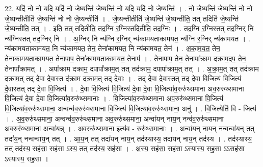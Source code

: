 \documentclass[17pt]{extarticle}
\begin{document}
22. यदि॑ नो नो॒ यदि॒ यदि॑ नो जे॒ष्यन्ति॑ जे॒ष्यन्ति॑ नो॒ यदि॒ यदि॑ नो जे॒ष्यन्ति॑ । . नो॒ जे॒ष्यन्ति॑ जे॒ष्यन्ति॑ नो नो जे॒ष्यन्तीतीति॑ जे॒ष्यन्ति॑ नो नो जे॒ष्यन्तीति॑ । . जे॒ष्यन्तीतीति॑ जे॒ष्यन्ति॑ जे॒ष्यन्तीति॒ तत् तदिति॑ जे॒ष्यन्ति॑ जे॒ष्यन्तीति॒ तत् । . इति॒ तत् तदितीति॒ तद॒ग्नि र॒ग्निस्तदितीति॒ तद॒ग्निः । . तद॒ग्नि र॒ग्निस्तत् तद॒ग्निर् नि न्य॑ग्निस्तत् तद॒ग्निर् नि । . अ॒ग्निर् नि न्य॑ग्नि र॒ग्निर् न्य॑कामयताकामयत॒ न्य॑ग्नि र॒ग्निर् न्य॑कामयत । . न्य॑कामयताकामयत॒ नि न्य॑कामयत॒ तेन॒ तेना॑कामयत॒ नि न्य॑कामयत॒ तेन॑ । . अ॒का॒म॒य॒त॒ तेन॒ तेना॑कामयताकामयत॒ तेनापाप॒ तेना॑कामयताकामयत॒ तेनाप॑ । . तेनापाप॒ तेन॒ तेनापा᳚क्राम दक्राम॒दप॒ तेन॒ तेनापा᳚क्रामत् । . अपा᳚क्राम दक्राम॒ दपापा᳚क्राम॒त् तत् तद॑क्राम॒ दपापा᳚क्राम॒त् तत् । . अ॒क्रा॒म॒त् तत् तद॑क्राम दक्राम॒त् तद् दे॒वा दे॒वास्त द॑क्राम दक्राम॒त् तद् दे॒वाः । . तद् दे॒वा दे॒वास्तत् तद् दे॒वा वि॒जित्य॑ वि॒जित्य॑ दे॒वास्तत् तद् दे॒वा वि॒जित्य॑ । . दे॒वा वि॒जित्य॑ वि॒जित्य॑ दे॒वा दे॒वा वि॒जित्या॑व॒रुरु॑थ्समाना अव॒रुरु॑थ्समाना वि॒जित्य॑ दे॒वा दे॒वा वि॒जित्या॑व॒रुरु॑थ्समानाः । . वि॒जित्या॑व॒रुरु॑थ्समाना अव॒रुरु॑थ्समाना वि॒जित्य॑ वि॒जित्या॑व॒रुरु॑थ्समाना॒ अन्वन्व॑व॒रुरु॑थ्समाना वि॒जित्य॑ वि॒जित्या॑व॒रुरु॑थ्समाना॒ अनु॑ । . वि॒जित्येति॑ वि - जित्य॑ । . अ॒व॒रुरु॑थ्समाना॒ अन्वन्व॑व॒रुरु॑थ्समाना अव॒रुरु॑थ्समाना॒ अन्वा॑यन् नाय॒न् नन्व॑व॒रुरु॑थ्समाना अव॒रुरु॑थ्समाना॒ अन्वा॑यन्न् । . अ॒व॒रुरु॑थ्समाना॒ इत्य॑व - रुरु॑थ्समानाः । . अन्वा॑यन् नाय॒न् नन्वन्वा॑य॒न् तत् तदा॑य॒न् नन्वन्वा॑य॒न् तत् । . आ॒य॒न् तत् तदा॑यन् नाय॒न् तद॑स्यास्य॒ तदा॑यन् नाय॒न् तद॑स्य । . तद॑स्यास्य॒ तत् तद॑स्य॒ सह॑सा॒ सह॑सा ऽस्य॒ तत् तद॑स्य॒ सह॑सा । . अ॒स्य॒ सह॑सा॒ सह॑सा ऽस्यास्य॒ सह॒सा ऽऽसह॑सा ऽस्यास्य॒ सह॒सा । \newline
\end{document}
